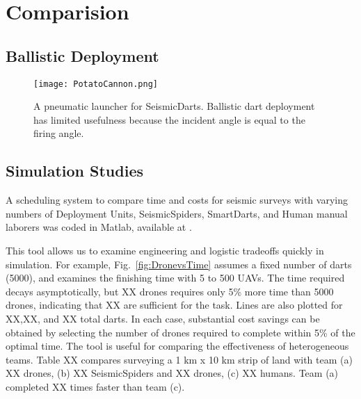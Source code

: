 \section{Comparision}\label{sec:Comparision}

\subsection{Ballistic Deployment}

\begin{figure} \centering
  {\texttt{[image: PotatoCannon.png]}}
 \caption{A pneumatic launcher for SeismicDarts.  Ballistic dart deployment has limited usefulness because the incident angle is equal to the firing angle.} 
 \label{fig:TradvsAutoDrop}
\end{figure}



\subsection{Simulation Studies}

A scheduling system to compare  time and costs for seismic surveys with varying numbers of Deployment Units, SeismicSpiders, SmartDarts, and Human manual laborers was coded in  {\sc Matlab}, available at \cite{Srikanth2016seismicScheduler}.

This tool allows us to examine engineering and logistic tradeoffs quickly in simulation.  For example, Fig.~\ref{fig:DronevsTime} assumes a fixed number of darts (5000), and examines the finishing time with 5 to 500 UAVs.  The time required decays asymptotically, but  XX drones requires only 5\% more time than 5000 drones, indicating that XX are sufficient for the task. Lines are also plotted for XX,XX, and XX total darts.  In each case, substantial cost savings can be obtained by selecting the number of drones required to complete within 5\% of the optimal time.
The tool is useful for comparing the effectiveness of heterogeneous teams.  Table XX compares surveying a 1 km x 10 km strip of land with team (a) XX drones, (b) XX SeismicSpiders and XX drones, (c) XX humans.  Team (a) completed XX times faster than team (c).

